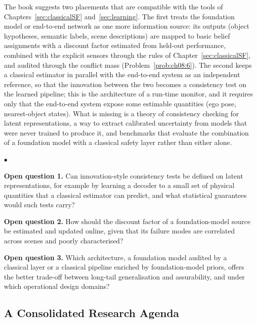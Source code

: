 \documentclass[graybox,envcountchap]{style/SNmono}
\newenvironment{list4a}{
  \begin{list}{$\bullet$}{
      \setlength{\itemsep}{0.05cm}
      \setlength{\labelsep}{0.2cm}
      \setlength{\labelwidth}{0.3cm}
      \setlength{\parsep}{0in}
      \setlength{\parskip}{0in}
      \setlength{\topsep}{0in}
      \setlength{\partopsep}{0in}
      \setlength{\leftmargin}{0.16in}}}
      {\end{list}}
\begin{document}
The book suggests two placements that are compatible with the tools of Chapters~\ref{sec:classicalSF} and~\ref{sec:learning}. The first treats the foundation model or end-to-end network as one more information source: its outputs (object hypotheses, semantic labels, scene descriptions) are mapped to basic belief assignments with a discount factor estimated from held-out performance, combined with the explicit sensors through the rules of Chapter~\ref{sec:classicalSF}, and audited through the conflict mass (Problem~\ref{prob:ch08:6}). The second keeps a classical estimator in parallel with the end-to-end system as an independent reference, so that the innovation between the two becomes a consistency test on the learned pipeline; this is the architecture of a run-time monitor, and it requires only that the end-to-end system expose some estimable quantities (ego pose, nearest-object states). What is missing is a theory of consistency checking for latent representations, a way to extract calibrated uncertainty from models that were never trained to produce it, and benchmarks that evaluate the combination of a foundation model with a classical safety layer rather than either alone.

\begin{list4a}
    \item \textbf{Open question 1.} Can innovation-style consistency tests be defined on latent representations, for example by learning a decoder to a small set of physical quantities that a classical estimator can predict, and what statistical guarantees would such tests carry?
    \item \textbf{Open question 2.} How should the discount factor of a foundation-model source be estimated and updated online, given that its failure modes are correlated across scenes and poorly characterised?
    \item \textbf{Open question 3.} Which architecture, a foundation model audited by a classical layer or a classical pipeline enriched by foundation-model priors, offers the better trade-off between long-tail generalisation and assurability, and under which operational design domains?
\end{list4a}

\subsection{A Consolidated Research Agenda}
\label{subsec:research-agenda}
\end{document}
